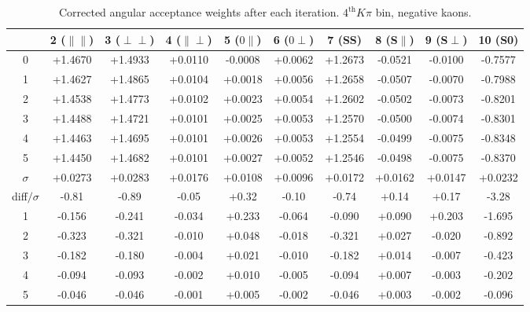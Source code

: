 \begin{table}[h!]
    \center\footnotesize
 \caption{\small Corrected angular acceptance weights after each iteration. $4^{\text{th}}K\pi$ bin, negative kaons.}
     \begin{tabular}{ c c c c c c c c c c}
       & 2 ($\parallel\parallel$) & 3 ($\perp\perp$) & 4 ($\parallel\perp$) & 5 ($0\parallel$) & 
       6 ($0\perp$) & 7 (SS) & 8 (S$\parallel$) & 9 (S$\perp$) & 10 (S0) \\
         \hline
      0 & +1.4670 & +1.4933 & +0.0110 & -0.0008 & +0.0062 & +1.2673 & -0.0521 & -0.0100 & -0.7577\\
      1 & +1.4627 & +1.4865 & +0.0104 & +0.0018 & +0.0056 & +1.2658 & -0.0507 & -0.0070 & -0.7988\\
      2 & +1.4538 & +1.4773 & +0.0102 & +0.0023 & +0.0054 & +1.2602 & -0.0502 & -0.0073 & -0.8201\\
      3 & +1.4488 & +1.4721 & +0.0101 & +0.0025 & +0.0053 & +1.2570 & -0.0500 & -0.0074 & -0.8301\\
      4 & +1.4463 & +1.4695 & +0.0101 & +0.0026 & +0.0053 & +1.2554 & -0.0499 & -0.0075 & -0.8348\\
      5 & +1.4450 & +1.4682 & +0.0101 & +0.0027 & +0.0052 & +1.2546 & -0.0498 & -0.0075 & -0.8370\\
     \hline
      $\sigma$ & +0.0273 & +0.0283 & +0.0176 & +0.0108 & +0.0096 & +0.0172 & +0.0162 & +0.0147 & +0.0232\\
     diff$/\sigma$& -0.81  & -0.89  & -0.05  & +0.32  & -0.10  & -0.74  & +0.14  & +0.17  & -3.28 \\
     \hline
      1 & -0.156  & -0.241  & -0.034  & +0.233  & -0.064  & -0.090  & +0.090  & +0.203  & -1.695 \\
      2 & -0.323  & -0.321  & -0.010  & +0.048  & -0.018  & -0.321  & +0.027  & -0.020  & -0.892 \\
      3 & -0.182  & -0.180  & -0.004  & +0.021  & -0.010  & -0.182  & +0.014  & -0.007  & -0.423 \\
      4 & -0.094  & -0.093  & -0.002  & +0.010  & -0.005  & -0.094  & +0.007  & -0.003  & -0.202 \\
      5 & -0.046  & -0.046  & -0.001  & +0.005  & -0.002  & -0.046  & +0.003  & -0.002  & -0.096 \\
     \end{tabular}
     \label{tab:norm_weights_evolution_8}
\end{table}
%
